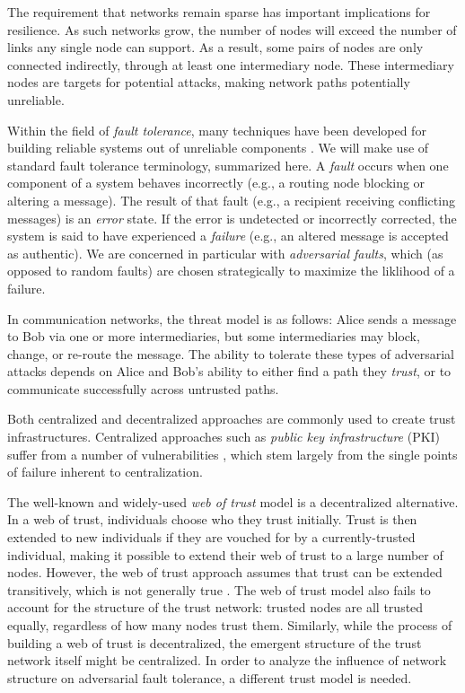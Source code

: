 \documentclass{sig-alternate-05-2015}
\begin{document}
The requirement that networks remain sparse has important implications for
resilience.
As such networks grow, the number of nodes will exceed the number of links
any single node can support.
As a result, some pairs of nodes are only connected indirectly,
through at least one intermediary node.
These intermediary nodes are targets for potential attacks,
making network paths potentially unreliable.

Within the field of {\em fault tolerance},
many techniques have been developed for building reliable systems
out of unreliable components
\cite{avizienis_basic_2004, von_neumann_probabilistic_1956}.
We will make use of standard fault tolerance terminology, summarized here.
A {\em fault} occurs when one component
of a system behaves incorrectly (e.g., a routing node blocking or
altering a message).
The result of that fault (e.g., a recipient receiving conflicting messages)
is an {\em error} state.
If the error is undetected or incorrectly corrected, the system is
said to have experienced a {\em failure} (e.g., an altered message is
accepted as authentic).
We are concerned in particular with {\em adversarial faults},
which (as opposed to random faults)
are chosen strategically to maximize the liklihood of a failure.

In communication networks, 
the threat model is as follows: Alice sends a message to
Bob via one or more intermediaries,
but some intermediaries may block, change, or re-route the message.
The ability to tolerate these types of adversarial attacks depends on
Alice and Bob's ability to either find a path they {\em trust},
or to communicate successfully across untrusted paths.

Both centralized and decentralized approaches are commonly used to create
trust infrastructures.
Centralized approaches such as {\em public key infrastructure} (PKI)
suffer from a number of vulnerabilities
\cite{ellison_ten_2000},
which stem largely from the single points of failure inherent to
centralization.

The well-known and widely-used {\em web of trust} model
\cite{zimmermann_official_1995,ferguson_practical_2003}
is a decentralized alternative.
In a web of trust,
individuals choose who they trust initially.
Trust is then extended to new individuals if they are vouched for by a
currently-trusted individual,
making it possible to extend their web of trust to a large
number of nodes.
However, the web of trust approach assumes that trust can be extended
transitively,
which is not generally true
\cite{christianson_why_1997}.
The web of trust model also fails to account for the structure
of the trust network:
trusted nodes are all trusted equally,
regardless of how many nodes trust them.
Similarly, while the process of building a web of trust is decentralized,
the emergent structure of the trust network itself might be centralized.
In order to analyze the influence of network structure on adversarial
fault tolerance,
a different trust model is needed.
\end{document}
